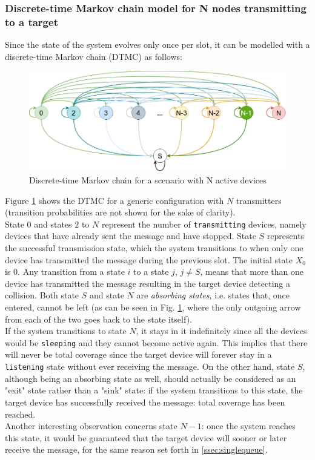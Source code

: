 \subsubsection{Discrete-time Markov chain model for N nodes transmitting to a target}
Since the state of the system evolves only once per slot, it can be modelled
with a discrete-time Markov chain (DTMC) as follows:
\begin{figure}[H]
    \begin{center}
        \includegraphics[scale=0.4]{img/DTMC.png}
        \caption{Discrete-time Markov chain for a scenario with N active devices}
        \label{fig:dtmc}
    \end{center}
\end{figure}
\noindent Figure \ref{fig:dtmc} shows the DTMC for a generic configuration with
$N$ transmitters (transition probabilities are not shown for the sake of clarity).\\
State $0$ and states $2$ to $N$ represent the number of \texttt{transmitting}
devices, namely devices that have already sent the message and have stopped. 
State $S$ represents the successful transmission state, which the system
transitions to when only one device has transmitted the message during the
previous slot.
The initial state $X_{0}$ is $0$. Any transition from a state $i$ to a state
$j$, $j \neq S$, means that more than one device has transmitted the message 
resulting in the target device detecting a collision.
Both state $S$ and state $N$ are \textit{absorbing states}, i.e. states that,
once entered, cannot be left (as can be seen in Fig. \ref{fig:dtmc}, where the
only outgoing arrow from each of the two goes back to the state itself).\\
If the system transitions to state $N$, it stays in it indefinitely since all
the devices would be \texttt{sleeping} and they cannot become active again. This
implies that there will never be total coverage since the target device will
forever stay in a \texttt{listening} state without ever receiving the message.
On the other hand, state $S$, although being an absorbing state as well, should
actually be considered as an "exit" state rather than a "sink" state: if the
system transitions to this state, the target device has successfully received
the message: total coverage has been reached.\\
Another interesting observation concerns state $N - 1$: once the system reaches
this state, it would be guaranteed that the target device will sooner or later
receive the message, for the same reason set forth in \ref{ssec:singlequeue}.
